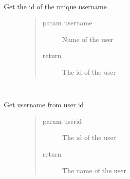 \documentclass[letterpaper,10pt,english]{sphinxmanual}
\begin{document}
\begin{fulllineitems}
\label{\detokenize{index:models.login.get_user_id_by_name}}~\begin{description}
\item[{Get the id of the unique username}] \leavevmode\begin{quote}\begin{description}
\item[{param username}] \leavevmode
Name of the user

\item[{return}] \leavevmode
The id of the user

\end{description}\end{quote}

\end{description}

\end{fulllineitems}


\begin{fulllineitems}
\label{\detokenize{index:models.login.get_user_name_by_id}}~\begin{description}
\item[{Get username from user id}] \leavevmode\begin{quote}\begin{description}
\item[{param userid}] \leavevmode
The id of the user

\item[{return}] \leavevmode
The name of the user

\end{description}\end{quote}

\end{description}

\end{fulllineitems}

\end{document}
